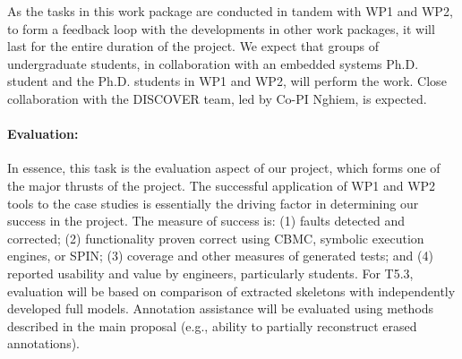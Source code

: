 As the tasks in this work package are conducted in tandem with WP1 and WP2, to form a feedback loop with the developments in other work packages, it will last for the entire duration of the project.
We expect that groups of undergraduate students, in collaboration with
an embedded systems Ph.D. student and the Ph.D. students in WP1 and WP2, will
perform the work.
Close collaboration with the DISCOVER team, led by Co-PI Nghiem, is expected.

\paragraph{Evaluation:} In essence, this task is the evaluation
aspect of our project, which forms one of the major thrusts of the
project.  The successful application of WP1 and WP2 tools to the case
studies is essentially the driving factor in determining our success
in the project.
The measure of success is: (1) faults detected and corrected; (2)
functionality proven correct using CBMC, symbolic execution engines,
or SPIN; (3) coverage and other measures of generated tests; and (4)
reported usability and value by engineers,
particularly students.  For T5.3, evaluation will be based on
comparison of extracted skeletons with independently developed full 
models.  Annotation assistance will be evaluated using methods
described in the main proposal (e.g., ability to partially reconstruct
erased annotations).



